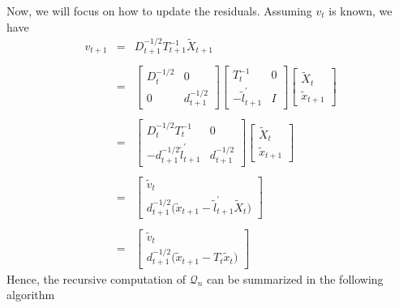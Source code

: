 \documentclass{article}
\begin{document}
Now, we will focus on how to update the residuals. Assuming $v_t$ is known, we have
\begin{equation}
\begin{array}{rcl}
  v_{t+1} & = &  D_{t+1}^{-1/2}T_{t+1}^{-1}\tilde{X}_{t+1} \\
          &   &  \\
          &  = &
          \begin{bmatrix} D_{t}^{-1/2} & 0 \\ 0 & d_{t+1}^{-1/2}  \end{bmatrix}
          \begin{bmatrix} T_{t}^{-1} & 0 \\ - \tilde{l}_{t+1}^\prime  & I  \end{bmatrix}
          \begin{bmatrix} \tilde{X}_{t} \\ \tilde{x}_{t+1}  \end{bmatrix} \\
          &   & \\
          &  = &  \begin{bmatrix} D_{t}^{-1/2} T_{t}^{-1} & 0 \\ -d_{t+1}^{-1/2}\tilde{l}_{t+1}^\prime   & d_{t+1}^{-1/2}  \end{bmatrix}
          \begin{bmatrix} \tilde{X}_{t} \\ \tilde{x}_{t+1}  \end{bmatrix} \\
          &   &  \\
          &  = &  \begin{bmatrix} \tilde{v}_{t} \\ d_{t+1}^{-1/2} \Big (\tilde{x}_{t+1} - \tilde{l}_{t+1}^\prime \tilde{X}_{t} \Big )  \end{bmatrix} \\
          &   &  \\
          &  = & \begin{bmatrix} \tilde{v}_{t} \\ d_{t+1}^{-1/2} \Big ( \tilde{x}_{t+1} - T_t  \tilde{x}_{t}    \Big ) \end{bmatrix}
\end{array}
\end{equation}
Hence, the recursive computation of $\mathcal{Q}_n$ can be summarized in the following
algorithm
\end{document}
